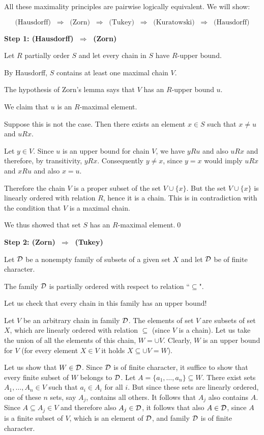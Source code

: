 \documentclass[11pt,paper=b5,footinclude,headinclude]{scrbook} %
\def\sledi {{~\Rightarrow~}}
\theoremstyle{remark}
\theoremstyle{definition} %
\theoremstyle{theorem} %
\begin{document}
\bigskip

All these maximality principles are pairwise logically equivalent.
We will show:

$$\textrm{(Hausdorff) $\sledi$ (Zorn) $\sledi$ (Tukey) $\sledi$ (Kuratowski) $\sledi$ (Hausdorff)}$$


\bigskip
\textbf{ Step 1: (Hausdorff) $\sledi$ (Zorn)}

Let $R$ partially order $S$ and let every chain in $S$ have $R$-upper bound.

By Hausdorff, $S$ contains at least one maximal chain $V$.

The hypothesis of Zorn's lemma says that $V$ has an $R$-upper bound $u$.

We claim that $u$ is an $R$-maximal element.

Suppose this is not the case.
Then there exists an element $x\in S$ such that $x\neq u$ and $uRx$.

Let $y\in V$. Since $u$ is an upper bound for chain $V$, we have $yRu$ and also $uRx$ and
therefore, by transitivity, $yRx$. Consequently $y\neq x$, since $y=x$ would imply $uRx$ and $xRu$ and also $x = u$.

Therefore the chain $V$ is a proper subset of the set $V\cup \{x\}$. But the set $V\cup \{x\}$ is linearly ordered with relation $R$, hence it is a chain.
This is in contradiction with the condition that $V$ is a maximal chain.

We thus showed that set $S$ has an $R$-maximal element.\qed

\bigskip
\textbf{ Step 2: (Zorn) $\sledi$ (Tukey)}

Let  ${\cal D}$ be a nonempty family of subsets of a given set $X$ and let ${\cal D}$ be of finite character.

The family ${\cal D}$ is partially ordered with respect to relation ``$\subseteq$".

Let us check that every chain in this family has an upper bound!

Let $V$ be an arbitrary chain in family ${\cal D}$.
The elements of set $V$ are subsets of set $X$, which are linearly ordered with relation $\subseteq$
(since $V$ is a chain).
Let us take the union of all the elements of this chain, $W = \cup V$.
Clearly, $W$ is an upper bound for $V$ (for every element $X\in V$ it holds $X\subseteq \cup V = W$).

Let us show that $W\in{\cal D}$. Since ${\cal D}$ is of finite character, it suffice to show that every finite subset of
$W$ belongs to ${\cal D}$.
Let $A=\{a_1,\ldots, a_n\}\subseteq W$. There exist sets $A_1,\ldots, A_n\in V$ such that $a_i\in A_i$ for all $i$.
But since these sets are linearly ordered, one of these $n$ sets, say $A_j$, contains all others.
It follows that $A_j$ also contains $A$. Since $A\subseteq A_j\in V$ and therefore also  $A_j\in {\cal D}$,
it follows that also $A\in {\cal D}$, since $A$ is a finite subset of $V$, which is an element of
${\cal D}$, and family ${\cal D}$ is of finite character.
\end{document}
